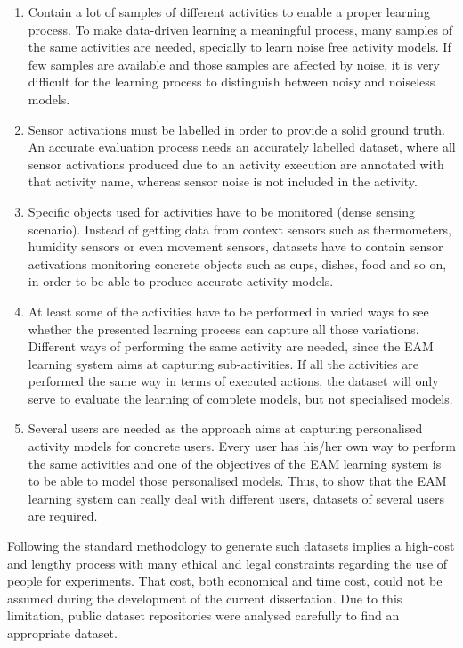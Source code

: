 \begin{enumerate}
 \item Contain a lot of samples of different activities to enable a proper learning process. To make data-driven learning a meaningful process, many samples of the same activities are needed, specially to learn noise free activity models. If few samples are available and those samples are affected by noise, it is very difficult for the learning process to distinguish between noisy and noiseless models.
 \item Sensor activations must be labelled in order to provide a solid ground truth. An accurate evaluation process needs an accurately labelled dataset, where all sensor activations produced due to an activity execution are annotated with that activity name, whereas sensor noise is not included in the activity.
 \item Specific objects used for activities have to be monitored (dense sensing scenario). Instead of getting data from context sensors such as thermometers, humidity sensors or even movement sensors, datasets have to contain sensor activations monitoring concrete objects such as cups, dishes, food and so on, in order to be able to produce accurate activity models.
 \item At least some of the activities have to be performed in varied ways to see whether the presented learning process can capture all those variations. Different ways of performing the same activity are needed, since the EAM learning system aims at capturing sub-activities. If all the activities are performed the same way in terms of executed actions, the dataset will only serve to evaluate the learning of complete models, but not specialised models.
 \item Several users are needed as the approach aims at capturing personalised activity models for concrete users. Every user has his/her own way to perform the same activities and one of the objectives of the EAM learning system is to be able to model those personalised models. Thus, to show that the EAM learning system can really deal with different users, datasets of several users are required.
\end{enumerate}

Following the standard methodology to generate such datasets implies a high-cost and lengthy process with many ethical and legal constraints regarding the use of people for experiments. That cost, both economical and time cost, could not be assumed during the development of the current dissertation. Due to this limitation, public dataset repositories were analysed carefully to find an appropriate dataset.


